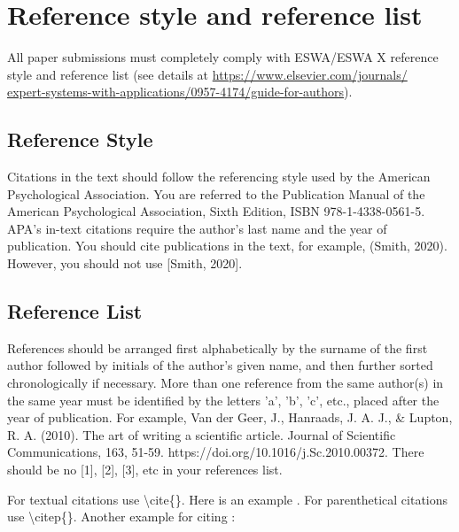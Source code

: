 \documentclass[review]{elsarticle}
\begin{document}
\section{Reference style and reference list}
\label{reference_style}

All paper submissions must completely comply with ESWA/ESWA X reference style and reference list (see details at
\href{https://www.elsevier.com/journals/expert-systems-with-applications/0957-4174/guide-for-authors}{https://www.elsevier.com/journals/\\expert-systems-with-applications/0957-4174/guide-for-authors}).

\subsection{Reference Style}
Citations in the text should follow the referencing style used by the American Psychological Association. You are referred to the Publication Manual of the American Psychological Association, Sixth Edition, ISBN 978-1-4338-0561-5.  APA's in-text citations require the author's last name and the year of publication. You should cite publications in the text, for example, (Smith, 2020).  However, you should not use [Smith, 2020].

\subsection{Reference List}
References should be arranged first alphabetically by the surname of the first author followed by initials of the author's given name, and then further sorted chronologically if necessary. More than one reference from the same author(s) in the same year must be identified by the letters 'a', 'b', 'c', etc., placed after the year of publication. For example, Van der Geer, J., Hanraads, J. A. J., \& Lupton, R. A. (2010). The art of writing a scientific article. Journal of Scientific Communications, 163, 51-59. https://doi.org/10.1016/j.Sc.2010.00372. There should be no [1], [2], [3], etc in your references list.


For textual citations use \textbackslash cite\{\}. Here is an example \cite{Feynman1963118,Dirac1953888}. For parenthetical citations use \textbackslash citep\{\}. Another example for citing \citep{Smith2012qr,Smith2013jd,art}: 
\end{document}
